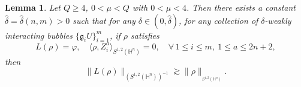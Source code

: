 \documentclass[11pt]{article}
\newtheorem{lemma}{Lemma}[section]
\begin{document}
\begin{lemma}\label{main5}
Let $Q\geq 4$, $0<\mu< Q$ with $0<\mu< 4$. Then there exists a constant $\hat{\delta}=\hat{\delta}(n,m)> 0$ such that for any $\delta\in (0,\hat{\delta})$, for any collection of ${\delta}$-weakly interacting bubbles $\big\{\mathfrak{g}_{i } U\big\}_{i=1}^m$, if $\rho$ satisfies %
\begin{equation*}
  L(\rho) = \varphi, \quad \langle \rho, Z_i^a \rangle_{S^{1,2}(\mathbb{H}^{n})}= 0 ,\quad\forall\, 1\leq i\leq m,\ 1\leq a\leq 2n+2,
\end{equation*}
then %
\begin{equation*}
 \|L(\rho) \|_{(S^{1,2}(\mathbb{H}^{n}))^{-1}} \gtrsim \|\rho\|_{_{S^{1,2}(\mathbb{H}^{n})}}.
\end{equation*}
\end{lemma}
\end{document}

